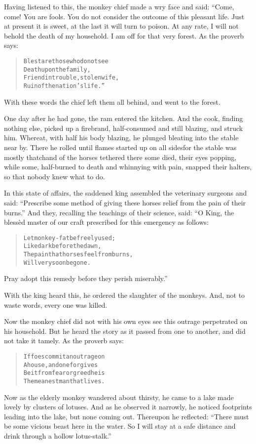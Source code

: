 \documentclass[article, twoside, 14pt]{memoir}
\renewenvironment{verbatim}{%
\begin{quote}%
\vskip -10pt%
\begin{alltt}\normalfont\large}{\end{alltt}%
\end{quote}%
\vskip -10pt
} %
\begin{document}
Having listened to this, the monkey chief made a wry face and said:
“Come, come! You are fools. You do not consider the outcome of this
pleasant life. Just at present it is sweet, at the last it will
turn to poison. At any rate, I will not behold the death of my
household. I am off for that very forest. As the proverb says:

\begin{verbatim}
Blest are those who do not see
Death upon the family,
Friend in trouble, stolen wife,
Ruin of the nation's life.”
\end{verbatim}
With these words the chief left them all behind, and went to the
forest.

One day after he had gone, the ram entered the kitchen. And the
cook, finding nothing else, picked up a firebrand, half-consumed
and still blazing, and struck him. Whereat, with half his body
blazing, he plunged bleating into the stable near by. There
he rolled until flames started up on all sides{\textemdash}for the stable was
mostly thatch{\textemdash}and of the horses tethered there some died, their
eyes popping, while some, half-burned to death and whinnying with
pain, snapped their halters, so that nobody knew what to do.

In this state of affairs, the saddened king assembled the
veterinary surgeons and said:
``Prescribe some method of giving these horses relief from the pain of their burns.''
And they, recalling the teachings of their science, said: “O King,
the blessèd master of our craft prescribed for this emergency as
follows:

\begin{verbatim}
Let monkey-fat be freely used;
    Like dark before the dawn,
The pain that horses feel from burns,
    Will very soon be gone.
\end{verbatim}
Pray adopt this remedy before they perish miserably.”

With the king heard this, he ordered the slaughter of the monkeys.
And, not to waste words, every one was killed.

Now the monkey chief did not with his own eyes see this outrage
perpetrated on his household. But he heard the story as it passed
from one to another, and did not take it tamely. As the proverb
says:

\begin{verbatim}
If foes commit an outrage on
    A house, and one forgives{\textemdash}
Be it from fear or greed{\textemdash}he is
    The meanest man that lives.
\end{verbatim}
Now as the elderly monkey wandered about thirsty, he came to a lake
made lovely by clusters of lotuses. And as he observed it narrowly,
he noticed footprints leading into the lake, but none coming out.
Thereupon he reflected:
``There must be some vicious beast here in the water. So I will stay at a safe distance and drink through a hollow lotus-stalk.''
\end{document}
